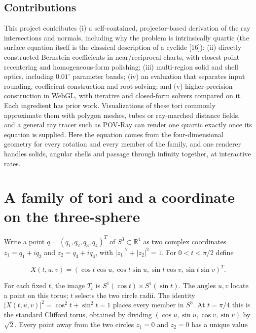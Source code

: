 \documentclass[11pt,a4paper]{article}
\begin{document}
\subsection*{Contributions}\label{contributions}

This project contributes (i) a self-contained, projector-based
derivation of the ray intersections and normals, including why the
problem is intrinsically quartic (the surface equation itself is the
classical description of a cyclide {[}16{]}); (ii) directly constructed
Bernstein coefficients in near/reciprocal charts, with closest-point
recentering and homogeneous-form polishing; (iii) multi-region solid and
shell optics, including \(0.01^\circ\) parameter bands; (iv) an
evaluation that separates input rounding, coefficient construction and
root solving; and (v) higher-precision construction in WebGL, with
iterative and closed-form solvers compared on it. Each ingredient has
prior work. Visualizations of these tori commonly approximate them with
polygon meshes, tubes or ray-marched distance fields, and a general ray
tracer such as POV-Ray can render one quartic exactly once its equation
is supplied. Here the equation comes from the four-dimensional geometry
for every rotation and every member of the family, and one renderer
handles solids, angular shells and passage through infinity together, at
interactive rates.

\section{A family of tori and a coordinate on the
three-sphere}\label{a-family-of-tori-and-a-coordinate-on-the-three-sphere}

Write a point \(q=(q_1,q_2,q_3,q_4)^T\) of \(S^3\subset\mathbb R^4\) as
two complex coordinates \(z_1=q_1+iq_2\) and \(z_2=q_3+iq_4\), with
\(|z_1|^2+|z_2|^2=1\). For \(0<t<\pi/2\) define

\[
X(t,u,v)=(\cos t\cos u,\cos t\sin u,\sin t\cos v,\sin t\sin v)^T.
\]

For each fixed \(t\), the image \(T_t\) is
\(S^1(\cos t)\times S^1(\sin t)\). The angles \(u,v\) locate a point on
this torus; \(t\) selects the two circle radii. The identity
\(|X(t,u,v)|^2=\cos^2t+\sin^2t=1\) places every member in \(S^3\). At
\(t=\pi/4\) this is the standard Clifford torus, obtained by dividing
\((\cos u,\sin u,\cos v,\sin v)\) by \(\sqrt{2}\). Every point away from
the two circles \(z_1=0\) and \(z_2=0\) has a unique value
\end{document}
